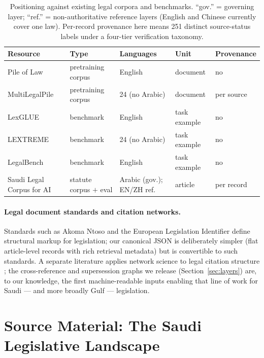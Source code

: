 \documentclass[11pt]{article}
\newcommand{\corpusname}{Saudi Legal Corpus for AI}
\begin{document}
\begin{table}[t]
\centering
\footnotesize
\begin{tabular}{lllll}
\toprule
\textbf{Resource} & \textbf{Type} & \textbf{Languages} & \textbf{Unit} & \textbf{Provenance} \\
\midrule
Pile of Law & pretraining corpus & English & document & no \\
MultiLegalPile & pretraining corpus & 24 (no Arabic) & document & per source \\
LexGLUE & benchmark & English & task example & no \\
LEXTREME & benchmark & 24 (no Arabic) & task example & no \\
LegalBench & benchmark & English & task example & no \\
\midrule
\corpusname & statute corpus $+$ eval & Arabic (gov.); EN/ZH ref. & article & per record \\
\bottomrule
\end{tabular}
\caption{Positioning against existing legal corpora and benchmarks. ``gov.''
= governing layer; ``ref.'' = non-authoritative reference layers (English
and Chinese currently cover one law). Per-record provenance here means 251
distinct source-status labels under a four-tier verification taxonomy.}
\label{tab:comparison}
\end{table}

\paragraph{Legal document standards and citation networks.}
Standards such as Akoma Ntoso \citep{palmirani2011akoma} and the European
Legislation Identifier define structural markup for legislation; our
canonical JSON is deliberately simpler (flat article-level records with rich
retrieval metadata) but is convertible to such standards. A separate
literature applies network science to legal citation structure
\citep{fowler2007network, katz2014complexity, coupette2021measuring}; the
cross-reference and supersession graphs we release
(Section~\ref{sec:layers}) are, to our knowledge, the first
machine-readable inputs enabling that line of work for Saudi --- and more
broadly Gulf --- legislation.

\section{Source Material: The Saudi Legislative Landscape}
\label{sec:sources}
\end{document}
